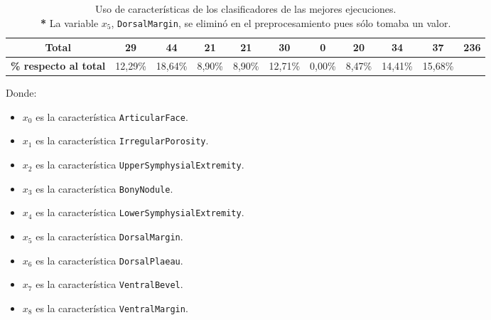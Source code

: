 \begin{table}[H]
{\begin{tabular}{|ccccccccccc|}
\multicolumn{1}{|c|}{\textbf{Total}}                & \multicolumn{1}{c|}{29}             & \multicolumn{1}{c|}{44}             & \multicolumn{1}{c|}{21}             & \multicolumn{1}{c|}{21}             & \multicolumn{1}{c|}{30}             & \multicolumn{1}{c|}{0}              & \multicolumn{1}{c|}{20}             & \multicolumn{1}{c|}{34}             & \multicolumn{1}{c|}{37}             & 236                                 \\ \hline
\multicolumn{1}{|c|}{\textbf{\% respecto al total}} & \multicolumn{1}{c|}{12,29\%}        & \multicolumn{1}{c|}{18,64\%}        & \multicolumn{1}{c|}{8,90\%}         & \multicolumn{1}{c|}{8,90\%}         & \multicolumn{1}{c|}{12,71\%}        & \multicolumn{1}{c|}{0,00\%}         & \multicolumn{1}{c|}{8,47\%}         & \multicolumn{1}{c|}{14,41\%}        & \multicolumn{1}{c|}{15,68\%}        &                                     \\ \hline
\end{tabular}%
}
\caption{Uso de características de los clasificadores de las mejores ejecuciones.\\ \textbf{*} La variable $x_5$, \texttt{DorsalMargin}, se eliminó en el preprocesamiento pues sólo tomaba un valor.} \label{tablaUsoCaracteristicas}
\end{table}

\vspace{-0.75cm}

Donde:

\begin{itemize}
	\setlength\itemsep{-0.1cm}
	\item $x_0$ es la característica \texttt{ArticularFace}.
	\item $x_1$ es la característica \texttt{IrregularPorosity}.
	\item $x_2$ es la característica \texttt{UpperSymphysialExtremity}.
	\item $x_3$ es la característica \texttt{BonyNodule}.
	\item $x_4$ es la característica \texttt{LowerSymphysialExtremity}.
	\item $x_5$ es la característica \texttt{DorsalMargin}.
	\item $x_6$ es la característica \texttt{DorsalPlaeau}.
	\item $x_7$ es la característica \texttt{VentralBevel}.
	\item $x_8$ es la característica \texttt{VentralMargin}.
\end{itemize}

